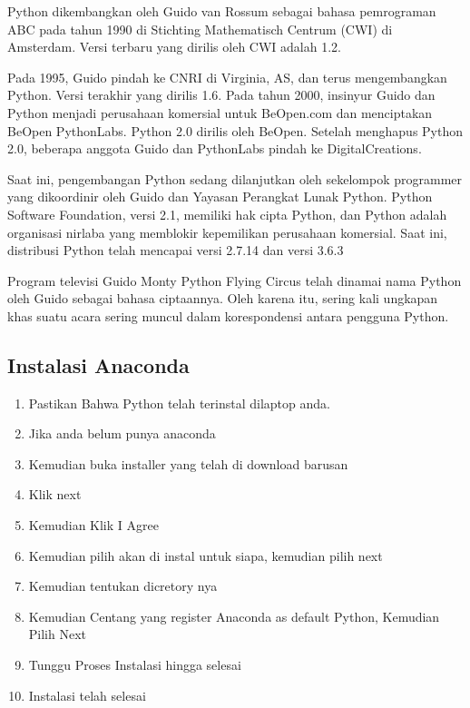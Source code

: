 Python dikembangkan oleh Guido van Rossum sebagai bahasa pemrograman ABC pada tahun 1990 di Stichting Mathematisch Centrum (CWI) di Amsterdam. Versi terbaru yang dirilis oleh CWI adalah 1.2.

Pada 1995, Guido pindah ke CNRI di Virginia, AS, dan terus mengembangkan Python. Versi terakhir yang dirilis 1.6. Pada tahun 2000, insinyur Guido dan Python menjadi perusahaan komersial untuk BeOpen.com dan menciptakan BeOpen PythonLabs. Python 2.0 dirilis oleh BeOpen. Setelah menghapus Python 2.0, beberapa anggota Guido dan PythonLabs pindah ke DigitalCreations.

Saat ini, pengembangan Python sedang dilanjutkan oleh sekelompok programmer yang dikoordinir oleh Guido dan Yayasan Perangkat Lunak Python. Python Software Foundation, versi 2.1, memiliki hak cipta Python, dan Python adalah organisasi nirlaba yang memblokir kepemilikan perusahaan komersial. Saat ini, distribusi Python telah mencapai versi 2.7.14 dan versi 3.6.3

Program televisi Guido Monty Python Flying Circus telah dinamai nama Python oleh Guido sebagai bahasa ciptaannya. Oleh karena itu, sering kali ungkapan khas suatu acara sering muncul dalam korespondensi antara pengguna Python.

\subsection{Instalasi Anaconda}
\begin{enumerate}
    \item Pastikan Bahwa Python telah terinstal dilaptop anda.
    \item Jika anda belum punya anaconda
    \item Kemudian buka installer yang telah di download barusan
    \item Klik next


    \item Kemudian Klik I Agree


    \item Kemudian pilih akan di instal untuk siapa, kemudian pilih next


    \item Kemudian tentukan dicretory nya


    \item Kemudian Centang yang register Anaconda as default Python, Kemudian Pilih Next


    \item Tunggu Proses Instalasi hingga selesai


    \item Instalasi telah selesai
	\end{enumerate}

